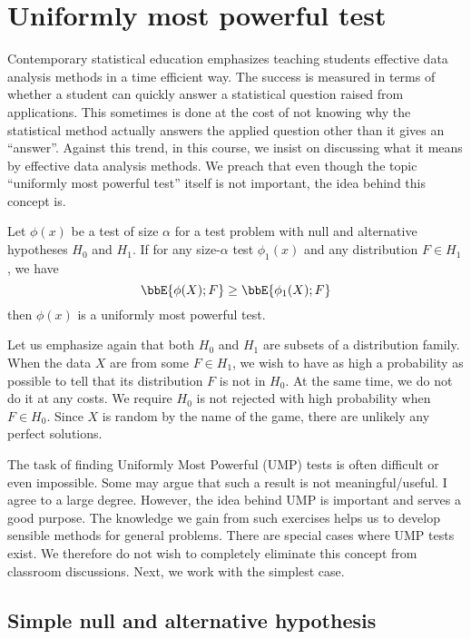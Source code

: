 \chapter{Uniformly most powerful test}

Contemporary statistical education emphasizes teaching students
effective data analysis methods in a time efficient way.
The success is measured in terms of whether a student can
quickly answer a statistical question raised from applications.
This sometimes is done at the cost of not knowing why the
statistical method actually answers the applied question other
than it gives an ``answer''.
Against this trend, in this course, we insist on discussing what it means by
effective data analysis methods.
We preach that even though the topic ``uniformly most powerful
test'' itself is not important, the idea behind this concept is.

\begin{defi}
Let $\phi(x)$ be a test of size $\alpha$ for a test problem with
null and alternative hypotheses $H_0$ and $H_1$.
If for any size-$\alpha$ test $\phi_1(x)$ and any distribution $F \in H_1$, we have
\[
\bbE\{ \phi(X); F \} \geq \bbE\{ \phi_1(X); F \} 
\]
then $\phi(x)$ is a uniformly most powerful test.
\end{defi}

Let us emphasize again that both $H_0$ and $H_1$ 
are subsets of a distribution family.
When the data $X$ are from some $F \in H_1$, we 
wish to have as high a probability as possible to 
tell that its distribution $F$ is not in $H_0$.
At the same time, we do not do it at any costs. We require
$H_0$ is not rejected with high probability when
$F \in H_0$. Since $X$ is random by the name of
the game, there are unlikely any perfect solutions.

The task of finding Uniformly Most Powerful (UMP) tests is
often difficult or even impossible. Some may argue that
such a result is not meaningful/useful. I agree to a large degree.
However, the idea behind UMP is important and serves a good purpose.
The knowledge we gain from such exercises helps us to develop 
sensible methods for general problems.
There are special cases where UMP tests exist. 
We therefore do not wish to completely eliminate this concept
from classroom discussions.
Next, we work with the simplest case. 

\section{Simple null and alternative hypothesis}

